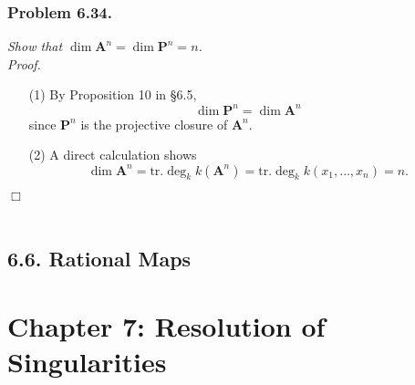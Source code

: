 \documentclass{article}
\begin{document}
\subsubsection*{Problem 6.34.}
\emph{Show that $\dim \mathbf{A}^{n} = \dim \mathbf{P}^{n} = n$.} \\



\emph{Proof.}
\begin{enumerate}
\item[(1)]
  By Proposition 10 in \S 6.5,
  \[
    \dim \mathbf{P}^{n} = \dim \mathbf{A}^{n}
  \]
  since $\mathbf{P}^{n}$ is the projective closure of $\mathbf{A}^{n}$.

\item[(2)]
  A direct calculation shows
  \[
    \dim \mathbf{A}^{n}
    = \mathrm{tr.} \deg_k k(\mathbf{A}^{n})
    = \mathrm{tr.} \deg_k k(x_1,\ldots,x_n)
    = n.
  \]
\end{enumerate}
$\Box$ \\\\








\subsection*{6.6. Rational Maps \\}






\newpage
\section*{Chapter 7: Resolution of Singularities \\}
\end{document}
